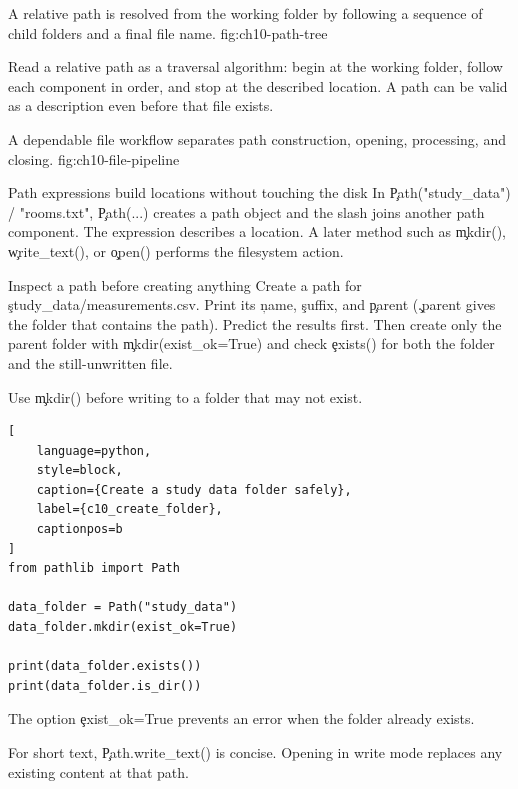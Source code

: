 {A relative path is resolved from the working folder by following a sequence of child folders and a final file name.}
{fig:ch10-path-tree}

Read a relative path as a traversal algorithm: begin at the working folder,
follow each component in order, and stop at the described location. A path can
be valid as a description even before that file exists.

{A dependable file workflow separates path construction, opening, processing, and closing.}
{fig:ch10-file-pipeline}

\begin{SyntaxBox}{Path expressions build locations without touching the disk}
In \c{Path("study_data") / "rooms.txt"}, \c{Path(...)} creates a path object
and the slash joins another path component. The expression describes a
location. A later method such as \c{mkdir()}, \c{write_text()}, or \c{open()}
performs the filesystem action.
\end{SyntaxBox}

\begin{TryBox}{Inspect a path before creating anything}
Create a path for \c{study_data/measurements.csv}. Print its \c{name},
\c{suffix}, and \c{parent} (\c{.parent} gives the folder that contains the
path). Predict the results first. Then create only the parent folder with
\c{mkdir(exist_ok=True)} and check \c{exists()} for both the folder and the
still-unwritten file.
\end{TryBox}


Use \c{mkdir()} before writing to a folder that may not exist.

\begin{lstlisting}[
    language=python,
    style=block,
    caption={Create a study data folder safely},
    label={c10_create_folder},
    captionpos=b
]
from pathlib import Path

data_folder = Path("study_data")
data_folder.mkdir(exist_ok=True)

print(data_folder.exists())
print(data_folder.is_dir())
\end{lstlisting}

The option \c{exist_ok=True} prevents an error when the folder already exists.


For short text, \c{Path.write_text()} is concise. Opening in write mode replaces
any existing content at that path.

